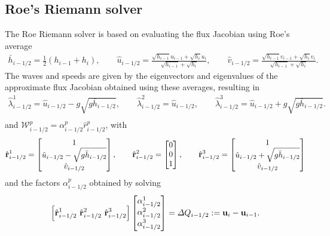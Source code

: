 \documentclass[preprint, 11pt]{article}
\newcommand{\W}{{\mathcal W}}
\newcommand{\imh}{{i-1/2}}
\newcommand{\bfr}{{\bf r}}
\newcommand{\bfu}{{\bf u}}
\begin{document}
\subsection{Roe's Riemann solver} \label{sec:roe}
The Roe Riemann solver is based on evaluating the flux Jacobian using Roe's average
\begin{align}\label{roe_average}
  \bar h_{i-1/2}=\frac{1}{2}(h_{i-1}+h_i), \qquad
  \hat u_{i-1/2}=\frac{\sqrt{h_{i-1}}u_{i-1}+\sqrt{h_i}u_i}{\sqrt{h_{i-1}}+\sqrt{h_i}}, \qquad
  \hat v_{i-1/2}=\frac{\sqrt{h_{i-1}}v_{i-1}+\sqrt{h_i}v_i}{\sqrt{h_{i-1}}+\sqrt{h_i}}.
\end{align}
The waves and speeds are given by the eigenvectors and eigenvalues of the approximate
flux Jacobian obtained using these averages, resulting in
\begin{align*}
  \hat\lambda_{i-1/2}^1=\hat u_{i-1/2}-g\sqrt{g\bar h_{i-1/2}}, \qquad
  \hat\lambda_{i-1/2}^2=\hat u_{i-1/2}, \qquad
  \hat\lambda_{i-1/2}^3=\hat u_{i-1/2}+g\sqrt{g\bar h_{i-1/2}}. \\
\end{align*}
and $\W_{i-1/2}^p=\alpha_{i-1/2}^p\hat r_{i-1/2}^p$, with
\begin{align*}
  \hat \bfr^1_{i-1/2} =
  \begin{bmatrix}
    1 \\
    \hat u_{i-1/2}-\sqrt{g\bar h_{i-1/2}}\\
    \hat v_{i-1/2}
  \end{bmatrix},
  \qquad
  \hat \bfr^2_{i-1/2} =
  \begin{bmatrix}
    0\\
    0\\
    1
  \end{bmatrix},
  \qquad
  \hat \bfr^3_{i-1/2} =
  \begin{bmatrix}
    1 \\
    \hat u_{i-1/2}+\sqrt{g\bar h_{i-1/2}}\\
    \hat v_{i-1/2}
  \end{bmatrix}
\end{align*}
and the factors $\alpha^p_\imh$ obtained by solving
\begin{align}\label{system_for_alphas}
  \left[\hat \bfr^1_{i-1/2} ~\hat \bfr^2_{i-1/2} ~\hat \bfr^3_{i-1/2}\right]
  \begin{bmatrix}
    \alpha^1_{i-1/2} \\
    \alpha^2_{i-1/2} \\
    \alpha^3_{i-1/2}
  \end{bmatrix}
  =\Delta Q_{i-1/2}:=\bfu_i-\bfu_{i-1}.
\end{align}
\end{document}
